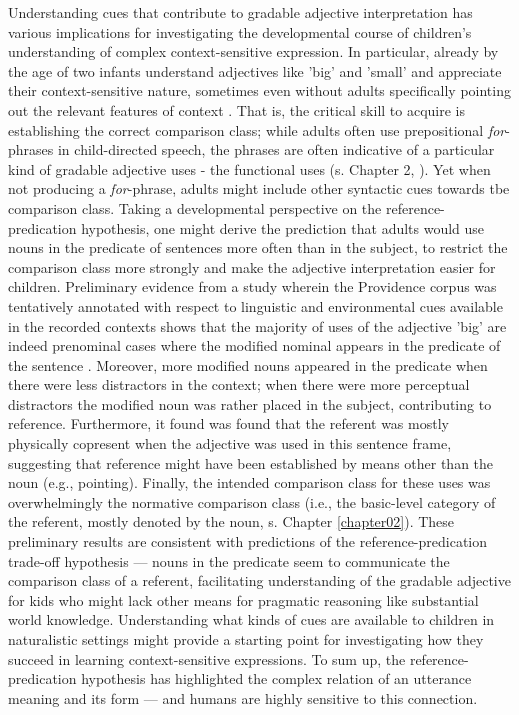 Understanding cues that contribute to gradable adjective interpretation has various implications for investigating the developmental course of children's understanding of complex context-sensitive expression. In particular, already by the age of two infants understand adjectives like 'big' and 'small' and appreciate their context-sensitive nature, sometimes even without adults specifically pointing out the relevant features of context \parencite{Mintz2002, ebeling1994children}. That is, the critical skill to acquire is establishing the correct comparison class; while adults often use prepositional \emph{for}-phrases in child-directed speech, the phrases are often indicative of a particular kind of gradable adjective uses - the functional uses (s. Chapter 2, \textcite{ebeling1994children}). Yet when not producing a \emph{for}-phrase, adults might include other syntactic cues towards tbe comparison class. Taking a developmental perspective on the reference-predication hypothesis, one might derive the prediction that adults would use nouns in the predicate of sentences more often than in the subject, to restrict the comparison class more strongly and make the adjective interpretation easier for children. Preliminary evidence from a study wherein the Providence corpus was tentatively annotated with respect to linguistic and environmental cues available in the recorded contexts %
shows that the majority of uses of the adjective 'big' are indeed prenominal cases where the modified nominal appears in the predicate of the sentence \parencite{sinelnikova2020}. Moreover, more modified nouns appeared in the predicate when there were less distractors in the context; when there were more perceptual distractors the modified noun was rather placed in the subject, contributing to reference. Furthermore, it found was found that the referent was mostly physically copresent when the adjective was used in this sentence frame, suggesting that reference might have been established by means other than the noun (e.g., pointing). Finally, the intended comparison class for these uses was overwhelmingly the normative comparison class (i.e., the basic-level  category of the referent, mostly denoted by the noun, s. Chapter \ref{chapter02}). These preliminary results are consistent with predictions of the reference-predication trade-off hypothesis ---  nouns in the predicate seem to communicate the comparison class of a referent, facilitating understanding of the gradable adjective for kids who might lack other means for pragmatic reasoning like substantial world knowledge. 
Understanding what kinds of cues are available to children in naturalistic settings might provide a starting point for investigating how they succeed in learning context-sensitive expressions. To sum up, the reference-predication hypothesis has highlighted the complex relation of an utterance meaning and its form --- and humans are highly sensitive to this connection.

